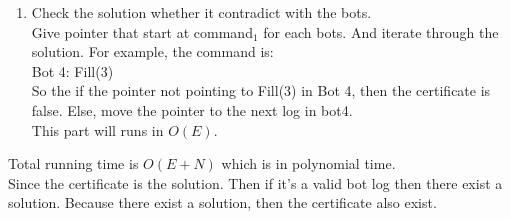 \documentclass{article}
\begin{document}
\begin{enumerate}
{\begin{enumerate}
{					This can be done by running the solution and keep track for every box. If there exist even one contradiction, the certificate is false. This part runs in $O(N)$.
				}
				\item {
					Check the solution whether it contradict with the bots.\\
					Give pointer that start at command$_1$ for each bots. And iterate through the solution. For example, the command is:\\
					Bot 4: Fill(3)\\
					So the if the pointer not pointing to Fill(3) in Bot 4, then the certificate is false. Else, move the pointer to the next log in bot4. \\
					This part will runs in $O(E)$.
				}
			\end{enumerate}
			Total running time is $O(E+N)$ which is in polynomial time.\\
			Since the certificate is the solution. Then if it's a valid bot log then there exist a solution. Because there exist a solution, then the certificate also exist. 
		}
	\end{enumerate}     
\end{document}
